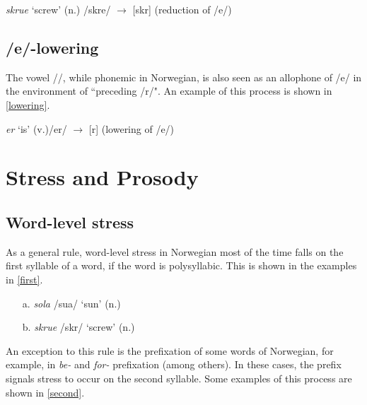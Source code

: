 \documentclass{article}
\begin{document}
\begin{exe}
    \ex
    \label{schwa}
    \textit{skrue} `screw' (n.) \newline /\textprimstress skr\textbaru e/ $\rightarrow$ [\textprimstress skr\textbaru\textschwa] (reduction of /e/)
\end{exe}

\subsection{/e/-lowering}
The vowel /\textipa{\ae}/, while phonemic in Norwegian, is also seen as an allophone of /e/ in the environment of ``preceding /r/". \cite{TheGermanicLanguages} An example of this process is shown in \ref{lowering}. \cite{Norwegian101}

\begin{exe}
    \ex
    \label{lowering}
    \textit{er} `is' (v.)\newline /er/ $\rightarrow$ [\textipa{\ae}r] (lowering of /e/)
\end{exe}

\section{Stress and Prosody}
\subsection{Word-level stress}
As a general rule, word-level stress in Norwegian most of the time falls on the first syllable of a word, if the word is polysyllabic. This is shown in the examples in \ref{first}. \cite{TransparentLanguage}

\begin{exe}
    \ex
    \label{first}
    \begin{itemize}
        \item [a.] \textit{sola} /\textprimstress su\textrtaill a/ `sun' (n.)
        \item [b.] \textit{skrue} /\textprimstress skr\textbaru\textschwa/ `screw' (n.)
    \end{itemize}
\end{exe}

An exception to this rule is the prefixation of some words of Norwegian, for example, in \textit{be-} and \textit{for-} prefixation (among others). In these cases, the prefix signals stress to occur on the second syllable. Some examples of this process are shown in \ref{second}. \cite{TransparentLanguage}
\end{document}
